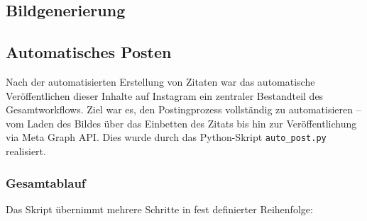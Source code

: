 \documentclass[a4paper,12pt]{article}
\begin{document}
\subsection{Bildgenerierung}

\subsection{Automatisches Posten}

Nach der automatisierten Erstellung von Zitaten war das automatische Veröffentlichen dieser Inhalte auf Instagram ein zentraler Bestandteil des Gesamtworkflows. Ziel war es, den Postingprozess vollständig zu automatisieren – vom Laden des Bildes über das Einbetten des Zitats bis hin zur Veröffentlichung via Meta Graph API. Dies wurde durch das Python-Skript \texttt{auto\_post.py} realisiert.

\subsubsection*{Gesamtablauf}

Das Skript übernimmt mehrere Schritte in fest definierter Reihenfolge:
\end{document}

